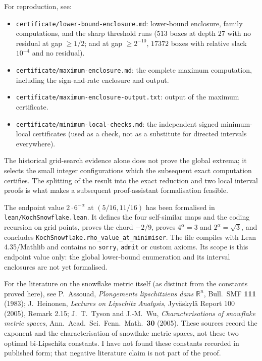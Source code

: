 \documentclass[11pt]{article}
\theoremstyle{remark}
\newcommand{\R}{\mathbb{R}}
\begin{document}
For reproduction, see:
\begin{itemize}\small
\item \texttt{certificate/lower-bound-enclosure.md}: lower-bound enclosure, family computations,
  and the sharp threshold runs ($513$ boxes at depth $27$ with no residual at gap $\ge1/2$; and at
  gap $\ge2^{-10}$, $17372$ boxes with relative slack $10^{-4}$ and no residual).
\item \texttt{certificate/maximum-enclosure.md}: the complete maximum computation, including the
  sign-and-rate enclosure and output.
\item \texttt{certificate/maximum-enclosure-output.txt}: output of the maximum certificate.
\item \texttt{certificate/minimum-local-checks.md}: the independent signed minimum-local
  certificates (used as a check, not as a substitute for directed intervals everywhere).
\end{itemize}
The historical grid-search evidence alone does not prove the global extrema; it selects the small
integer configurations which the subsequent exact computation certifies. The splitting of the
result into the exact reduction and two local interval proofs is what makes a subsequent
proof-assistant formalisation feasible.

The endpoint value $2\cdot6^{-\alpha}$ at $(5/16,11/16)$ has been formalised in
\texttt{lean/KochSnowflake.lean}. It defines the four self-similar maps and the coding recursion on
grid points, proves the chord $-2/9$, proves $4^{\alpha}=3$ and $2^{\alpha}=\sqrt3$, and concludes
\texttt{KochSnowflake.rho\_value\_at\_minimiser}. The file compiles with Lean 4.35/Mathlib and
contains no \texttt{sorry}, \texttt{admit} or custom axioms. Its scope is this endpoint value only:
the global lower-bound enumeration and its interval enclosures are not yet formalised.

For the literature on the snowflake metric itself (as distinct from the constants proved here), see
P.~Assouad, \emph{Plongements lipschitziens dans $\R^n$}, Bull.\ SMF \textbf{111} (1983);
J.~Heinonen, \emph{Lectures on Lipschitz Analysis}, Jyväskylä Report 100 (2005), Remark 2.15;
J.~T.~Tyson and J.-M.~Wu, \emph{Characterisations of snowflake metric spaces},
Ann.\ Acad.\ Sci.\ Fenn.\ Math.\ \textbf{30} (2005). These sources record the exponent and the
characterisation of snowflake metric spaces, not these two optimal bi-Lipschitz constants. I have
not found these constants recorded in published form; that negative literature claim is not part
of the proof.
\end{document}
